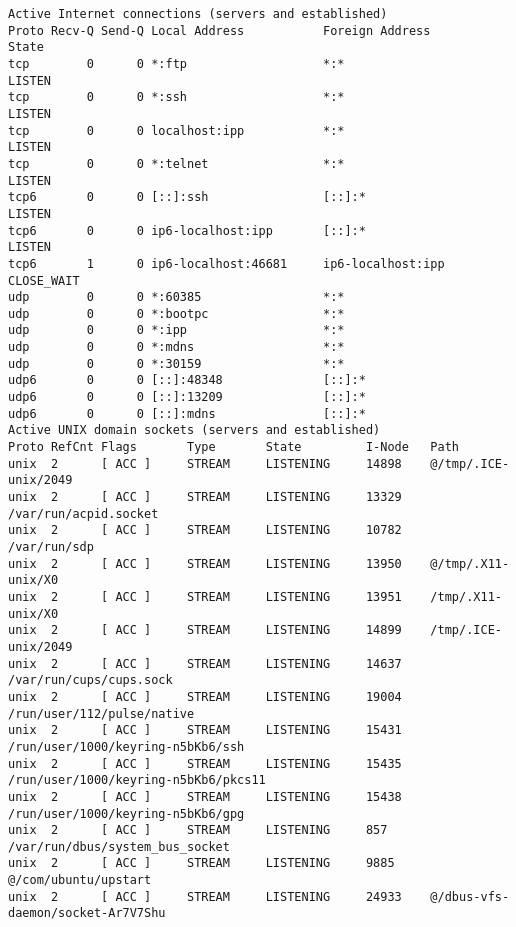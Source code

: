 \begin{lstlisting}
Active Internet connections (servers and established)
Proto Recv-Q Send-Q Local Address           Foreign Address         State      
tcp        0      0 *:ftp                   *:*                     LISTEN     
tcp        0      0 *:ssh                   *:*                     LISTEN     
tcp        0      0 localhost:ipp           *:*                     LISTEN     
tcp        0      0 *:telnet                *:*                     LISTEN     
tcp6       0      0 [::]:ssh                [::]:*                  LISTEN     
tcp6       0      0 ip6-localhost:ipp       [::]:*                  LISTEN     
tcp6       1      0 ip6-localhost:46681     ip6-localhost:ipp       CLOSE_WAIT 
udp        0      0 *:60385                 *:*                                
udp        0      0 *:bootpc                *:*                                
udp        0      0 *:ipp                   *:*                                
udp        0      0 *:mdns                  *:*                                
udp        0      0 *:30159                 *:*                                
udp6       0      0 [::]:48348              [::]:*                             
udp6       0      0 [::]:13209              [::]:*                             
udp6       0      0 [::]:mdns               [::]:*                             
Active UNIX domain sockets (servers and established)
Proto RefCnt Flags       Type       State         I-Node   Path
unix  2      [ ACC ]     STREAM     LISTENING     14898    @/tmp/.ICE-unix/2049
unix  2      [ ACC ]     STREAM     LISTENING     13329    /var/run/acpid.socket
unix  2      [ ACC ]     STREAM     LISTENING     10782    /var/run/sdp
unix  2      [ ACC ]     STREAM     LISTENING     13950    @/tmp/.X11-unix/X0
unix  2      [ ACC ]     STREAM     LISTENING     13951    /tmp/.X11-unix/X0
unix  2      [ ACC ]     STREAM     LISTENING     14899    /tmp/.ICE-unix/2049
unix  2      [ ACC ]     STREAM     LISTENING     14637    /var/run/cups/cups.sock
unix  2      [ ACC ]     STREAM     LISTENING     19004    /run/user/112/pulse/native
unix  2      [ ACC ]     STREAM     LISTENING     15431    /run/user/1000/keyring-n5bKb6/ssh
unix  2      [ ACC ]     STREAM     LISTENING     15435    /run/user/1000/keyring-n5bKb6/pkcs11
unix  2      [ ACC ]     STREAM     LISTENING     15438    /run/user/1000/keyring-n5bKb6/gpg
unix  2      [ ACC ]     STREAM     LISTENING     857      /var/run/dbus/system_bus_socket
unix  2      [ ACC ]     STREAM     LISTENING     9885     @/com/ubuntu/upstart
unix  2      [ ACC ]     STREAM     LISTENING     24933    @/dbus-vfs-daemon/socket-Ar7V7Shu

\end{lstlisting}
